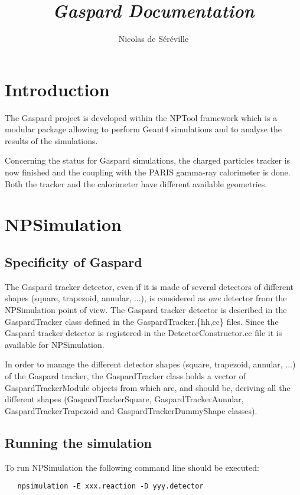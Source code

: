 \documentclass[a4paper,12pt]{article}
\begin{document}
\title{\emph{Gaspard Documentation}}
\author{Nicolas de S\'er\'eville}

\maketitle 
\pagebreak
\tableofcontents
\pagebreak


\section{Introduction}
The Gaspard project is developed within the NPTool framework which is a 
modular package allowing to perform Geant4 simulations and to analyse the 
results of the simulations. 

Concerning the status for Gaspard simulations, the charged particles tracker
is now finished and the coupling with the PARIS gamma-ray calorimeter is
done. Both the tracker and the calorimeter have different available geometries.


\section{NPSimulation}
\subsection{Specificity of Gaspard}
The Gaspard tracker detector, even if it is made of several detectors of
different shapes (square, trapezoid, annular, ...), is considered as {\it one} 
detector from the NPSimulation point of view. The Gaspard tracker detector 
is described in the GaspardTracker class defined in the GaspardTracker.\{hh,cc\} 
files. Since the Gaspard tracker detector is registered in the 
DetectorConstructor.cc file it is available for NPSimulation.

In order to manage the different detector shapes (square, trapezoid, annular, 
...) of the Gaspard tracker, the GaspardTracker class holds a vector of 
GaspardTrackerModule objects from which are, and should be, deriving all 
the different shapes (GaspardTrackerSquare, GaspardTrackerAnnular,
GaspardTrackerTrapezoid and GaspardTrackerDummyShape classes).


\subsection{Running the simulation}
To run NPSimulation the following command line should be executed: 

\begin{verbatim}
   npsimulation -E xxx.reaction -D yyy.detector
\end{verbatim}
\end{document}
